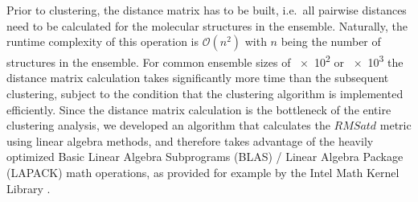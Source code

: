Prior to clustering, the distance matrix has to be built, i.e.\ all pairwise
distances need to be calculated for the molecular structures in the ensemble.
Naturally, the runtime complexity of this operation is $\mathcal{O}(n^2)$ with
$n$ being the number of structures in the ensemble. For common ensemble sizes of
\num{e2} or \num{e3} the distance matrix calculation takes significantly more
time than the subsequent clustering, subject to the condition that the
clustering algorithm is implemented efficiently. Since the distance matrix
calculation is the bottleneck of the entire clustering analysis, we developed an
algorithm that calculates the $RMSatd$ metric using linear algebra methods, and
therefore takes advantage of the heavily optimized Basic Linear Algebra
Subprograms (BLAS) / Linear Algebra Package (LAPACK) math operations, as
provided for example by the Intel Math Kernel Library \cite{intel_mkl_2014}.

